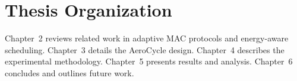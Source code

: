 \section{Thesis Organization}
Chapter~2 reviews related work in adaptive MAC protocols and energy-aware scheduling.
Chapter~3 details the AeroCycle design. Chapter~4 describes the experimental methodology.
Chapter~5 presents results and analysis. Chapter~6 concludes and outlines future work.

